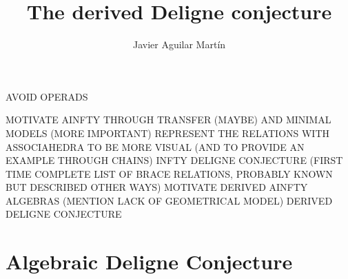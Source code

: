 \documentclass{beamer}
\title{The derived Deligne conjecture}
\author{Javier Aguilar Mart\'in}
\institute{University of Kent}
\date{}
\theoremstyle{definition}
\begin{document}
\frame{\titlepage}

\begin{frame}
AVOID OPERADS

MOTIVATE AINFTY THROUGH TRANSFER (MAYBE) AND MINIMAL MODELS (MORE IMPORTANT)
REPRESENT THE RELATIONS WITH ASSOCIAHEDRA TO BE MORE VISUAL (AND TO PROVIDE AN EXAMPLE THROUGH CHAINS)
INFTY DELIGNE CONJECTURE (FIRST TIME COMPLETE LIST OF BRACE RELATIONS, PROBABLY KNOWN BUT DESCRIBED OTHER WAYS)
MOTIVATE DERIVED AINFTY ALGEBRAS (MENTION LACK OF GEOMETRICAL MODEL)
DERIVED DELIGNE CONJECTURE

\end{frame}
\begin{frame}
\tableofcontents
\end{frame}

\section{Algebraic Deligne Conjecture}
\end{document}
